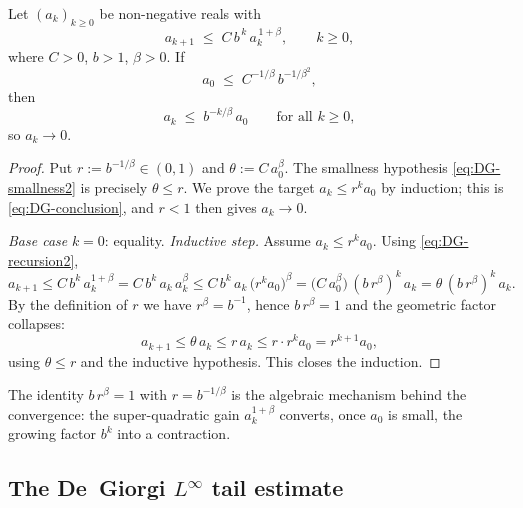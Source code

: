 \begin{lemma}\label{lem:DG-iteration2}
Let $(a_k)_{k\ge0}$ be non-negative reals with
\begin{equation}\label{eq:DG-recursion2}
   a_{k+1}\;\le\;C\,b^{\,k}\,a_k^{\,1+\beta},\qquad k\ge0,
\end{equation}
where $C>0$, $b>1$, $\beta>0$. If
\begin{equation}\label{eq:DG-smallness2}
   a_0\;\le\;C^{-1/\beta}\,b^{-1/\beta^2},
\end{equation}
then
\begin{equation}\label{eq:DG-conclusion}
   a_k\;\le\;b^{-k/\beta}\,a_0\qquad\text{for all }k\ge0,
\end{equation}
so $a_k\to0$.
\end{lemma}

\begin{proof}
Put $r:=b^{-1/\beta}\in(0,1)$ and $\theta:=C\,a_0^{\beta}$. The smallness
hypothesis \eqref{eq:DG-smallness2} is precisely $\theta\le r$. We prove
the target $a_k\le r^{k}a_0$ by induction; this is
\eqref{eq:DG-conclusion}, and $r<1$ then gives $a_k\to0$.

\emph{Base case} $k=0$: equality. \emph{Inductive step.} Assume
$a_k\le r^{k}a_0$. Using \eqref{eq:DG-recursion2},
\[
   a_{k+1}\le C\,b^{k}\,a_k^{1+\beta}
          =C\,b^{k}\,a_k\,a_k^{\beta}
          \le C\,b^{k}\,a_k\,\bigl(r^{k}a_0\bigr)^{\beta}
          =\bigl(C\,a_0^{\beta}\bigr)\,(b\,r^{\beta})^{k}\,a_k
          =\theta\,(b\,r^{\beta})^{k}\,a_k .
\]
By the definition of $r$ we have $r^{\beta}=b^{-1}$, hence $b\,r^{\beta}=1$
and the geometric factor collapses:
\[
   a_{k+1}\le\theta\,a_k\le r\,a_k\le r\cdot r^{k}a_0=r^{k+1}a_0,
\]
using $\theta\le r$ and the inductive hypothesis. This closes the
induction.
\end{proof}

\begin{remark}
The identity $b\,r^{\beta}=1$ with $r=b^{-1/\beta}$ is the algebraic
mechanism behind the convergence: the super-quadratic gain
$a_k^{1+\beta}$ converts, once $a_0$ is small, the growing factor $b^k$
into a contraction.
\end{remark}

\subsection{The De~Giorgi \texorpdfstring{$L^\infty$}{L-infinity} tail
estimate}\label{ssec:Linfty}

